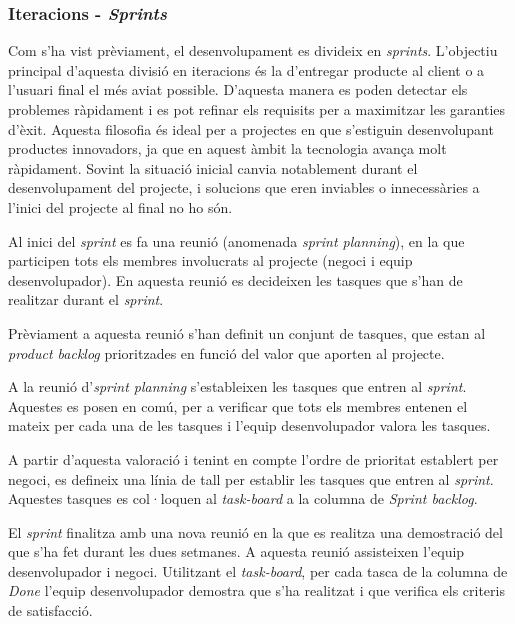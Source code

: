 
\subsubsection{Iteracions - \textit{Sprints}}

Com s'ha vist prèviament, el desenvolupament es divideix en \textit{sprints}. L'objectiu principal d'aquesta divisió en iteracions és la d'entregar producte al client o a l'usuari final el més aviat possible. D'aquesta manera es poden detectar els problemes ràpidament i es pot refinar els requisits per a maximitzar les garanties d'èxit. Aquesta filosofia és ideal per a projectes en que s'estiguin desenvolupant productes innovadors, ja que en aquest àmbit la tecnologia avança molt ràpidament. Sovint la situació inicial canvia notablement durant el desenvolupament del projecte, i solucions que eren inviables o innecessàries a l'inici del projecte al final no ho són.

Al inici del \textit{sprint} es fa una reunió (anomenada \textit{sprint planning}), en la que participen tots els membres involucrats al projecte (negoci i equip desenvolupador). En aquesta reunió es decideixen les tasques que s'han de realitzar durant el \textit{sprint}. 

Prèviament a aquesta reunió s'han definit un conjunt de tasques, que estan al \textit{product backlog} prioritzades en funció del valor que aporten al projecte.

A la reunió d'\textit{sprint planning} s'estableixen les tasques que entren al \textit{sprint}. Aquestes es posen en comú, per a verificar que tots els membres entenen el mateix per cada una de les tasques i l'equip desenvolupador valora les tasques. 

A partir d'aquesta valoració i tenint en compte l'ordre de prioritat establert per negoci, es defineix una línia de tall per establir les tasques que entren al \textit{sprint}. Aquestes tasques es col·loquen al \textit{task-board} a la columna de \textit{Sprint backlog}.

El \textit{sprint} finalitza amb una nova reunió en la que es realitza una demostració del que s'ha fet durant les dues setmanes. A aquesta reunió assisteixen l'equip desenvolupador i negoci. Utilitzant el \textit{task-board}, per cada tasca de la columna de \textit{Done} l'equip desenvolupador demostra que s'ha realitzat i que verifica els criteris de satisfacció.

